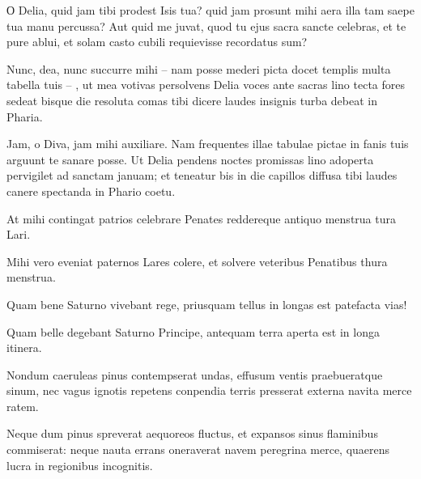\noindent О Delia, quid jam tibi prodest Isis tua? quid jam prosunt mihi aera illa tam saepe tua manu percussa? Aut quid me juvat, quod tu ejus sacra sancte celebras, et te pure ablui, et solam casto cubili requievisse recordatus sum? \\

{\large

\noindent Nunc, dea, nunc succurre mihi – nam posse mederi picta docet templis multa tabella tuis – , ut mea votivas persolvens Delia voces ante sacras lino tecta fores sedeat bisque die resoluta comas tibi dicere laudes insignis turba debeat in Pharia.\\

}


\noindent Jam, o Diva, jam mihi auxiliare. Nam frequentes illae tabulae pictae in fanis tuis arguunt te sanare posse. Ut Delia pendens noctes promissas lino adoperta pervigilet ad sanctam januam; et teneatur bis in die capillos diffusa tibi laudes canere spectanda in Phario coetu. \\

\newpage

{\large

\noindent At mihi contingat patrios celebrare Penates reddereque antiquo menstrua tura Lari.\\

}


\noindent Mihi vero eveniat paternos Lares colere, et solvere veteribus Penatibus thura menstrua. \\


{\large

\noindent Quam bene Saturno vivebant rege, priusquam tellus in longas est patefacta vias!\\

}


\noindent Quam belle degebant Saturno Principe, antequam terra aperta est in longa itinera.\\ 

{\large

\noindent Nondum caeruleas pinus contempserat undas, effusum ventis praebueratque sinum, nec vagus ignotis repetens conpendia terris presserat externa navita merce ratem.\\

}


\noindent Neque dum pinus spreverat aequoreos fluctus, et expansos sinus flaminibus commiserat: neque nauta errans oneraverat navem peregrina merce, quaerens lucra in regionibus incognitis. \\

